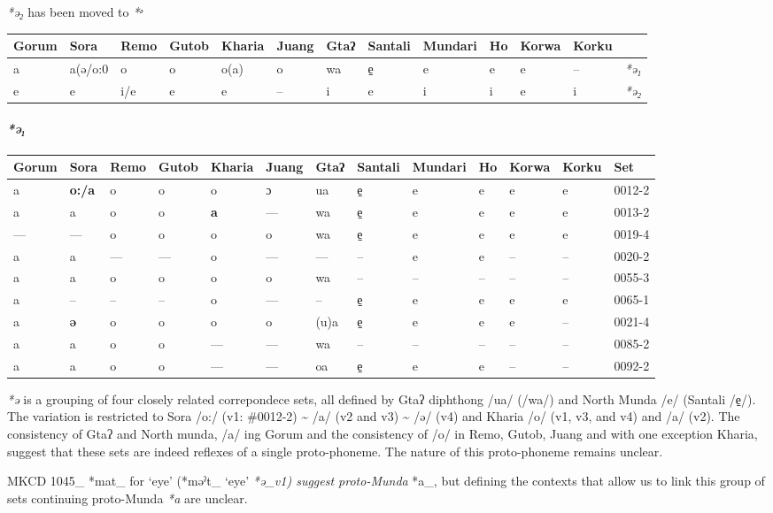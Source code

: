\documentclass[a4paper,]{article}
\let\oldparagraph\paragraph
\renewcommand{\paragraph}[1]{\oldparagraph{#1}\mbox{}}
\begin{document}
\emph{*ə₂} has been moved to \emph{*ᵊ}

\begin{longtable}[]{@{}lllllllllllll@{}}
\toprule
Gorum & Sora & Remo & Gutob & Kharia & Juang & Gtaʔ & Santali & Mundari
& Ho & Korwa & Korku &\tabularnewline
\midrule
\endhead
a & a(ə/o:0 & o & o & o(a) & o & wa & e̠ & e & e & e & -- &
\emph{*ə₁}\tabularnewline
e & e & i/e & e & e & -- & i & e & i & i & e & i &
\emph{*ə₂}\tabularnewline
\bottomrule
\end{longtable}

\paragraph{\texorpdfstring{\emph{*ə₁}}{*ə₁}}\label{ux259}

\begin{longtable}[]{@{}lllllllllllll@{}}
\toprule
Gorum & Sora & Remo & Gutob & Kharia & Juang & Gtaʔ & Santali & Mundari
& Ho & Korwa & Korku & Set\tabularnewline
\midrule
\endhead
a & \textbf{o:/a} & o & o & o & ɔ & ua & e̠ & e & e & e & e &
0012-2\tabularnewline
a & a & o & o & \textbf{a} & --- & wa & e̠ & e & e & e & e &
0013-2\tabularnewline
--- & --- & o & o & o & o & wa & e̠ & e & e & e & e &
0019-4\tabularnewline
a & a & --- & --- & o & --- & --- & -- & e & e & -- & -- &
0020-2\tabularnewline
a & a & o & o & o & o & wa & -- & -- & -- & -- & -- &
0055-3\tabularnewline
a & -- & -- & -- & o & --- & -- & e̠ & e & e & e & e &
0065-1\tabularnewline
a & \textbf{ə} & o & o & o & o & (u)a & e̠ & e & e & e & -- &
0021-4\tabularnewline
a & a & o & o & --- & --- & wa & -- & -- & -- & -- & -- &
0085-2\tabularnewline
a & a & o & o & --- & --- & oa & e̠ & e & e & -- & -- &
0092-2\tabularnewline
\bottomrule
\end{longtable}

\emph{*ə} is a grouping of four closely related correpondece sets, all
defined by Gtaʔ diphthong /ua/ (/wa/) and North Munda /e/ (Santali /e̠/).
The variation is restricted to Sora /o:/ (v1: \#0012-2)
\textasciitilde{} /a/ (v2 and v3) \textasciitilde{} /ə/ (v4) and Kharia
/o/ (v1, v3, and v4) and /a/ (v2). The consistency of Gtaʔ and North
munda, /a/ ing Gorum and the consistency of /o/ in Remo, Gutob, Juang
and with one exception Kharia, suggest that these sets are indeed
reflexes of a single proto-phoneme. The nature of this proto-phoneme
remains unclear.

MKCD 1045\_ *mat\_ for `eye' (*məˀt\_ `eye' \emph{*ə\_v1) suggest
proto-Munda }*a\_, but defining the contexts that allow us to link this
group of sets continuing proto-Munda \emph{*a} are unclear.
\end{document}
